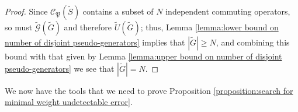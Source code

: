 \documentclass[twocolumn,showpacs,preprintnumbers,amsmath,amssymb,nofootinbib,pra,floatfix]{revtex4-1}
\newenvironment{remark}[1][Remark]{\begin{trivlist}
\item[\hskip \labelsep {\bfseries #1}]}{\end{trivlist}}
\newcommand{\set}{\tilde}
\newcommand{\genfun}{\tilde{\mathcal{G}}}
\newcommand{\pauligroup}{\mathfrak{P}}
\newcommand{\centralizer}{\mathcal{C}}
\begin{document}
\begin{proof}
Since $\centralizer_\pauligroup(\set S)$ contains a subset of $N$ independent commuting operators, so must $\genfun(\set G)$ and therefore $\set U(\set G)$;  thus, Lemma \ref{lemma:lower bound on number of disjoint pseudo-generators} implies that $|\set G|\ge N$, and combining this bound with that given by Lemma \ref{lemma:upper bound on number of disjoint pseudo-generators} we see that $|\set G|=N$.
\end{proof}
\begin{remark}
We now have the tools that we need to prove Proposition \ref{proposition:search for minimal weight undetectable error}.
\end{remark}
\end{document}
